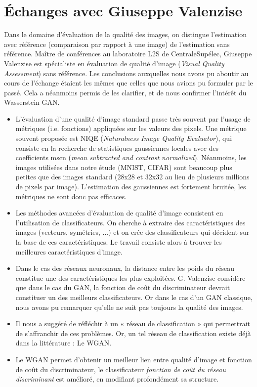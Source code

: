 \section{Échanges avec Giuseppe Valenzise}
Dans le domaine d'évaluation de la qualité des images, on distingue l'estimation avec référence (comparaison par rapport à une image) de l'estimation sans référence.
Maître de conférences au laboratoire L2S de CentraleSupélec, Giuseppe Valenzise est spécialiste en évaluation de qualité d'image (\textit{Visual Quality Assessment}) sans référence.
Les conclusions auxquelles nous avons pu aboutir au cours de l'échange étaient les mêmes que celles que nous avions pu formuler par le passé. Cela a néanmoins permis de les clarifier, et de nous confirmer l'intérêt du Wasserstein GAN. 
\begin{itemize}
\item L'évaluation d'une qualité d'image standard passe très souvent par l'usage de métriques (i.e. fonctions) appliquées sur les valeurs des pixels. Une métrique souvent proposée est NIQE (\textit{Naturalness Image Quality Evaluator}), qui consiste en la recherche de statistiques gaussiennes locales avec des coefficients mscn (\textit{mean subtracted and contrast normalized}). Néanmoins, les images utilisées dans notre étude (MNIST, CIFAR) sont beaucoup plus petites que des images standard (28x28 et 32x32 au lieu de plusieurs millions de pixels par image). L'estimation des gaussiennes est fortement bruitée, les métriques ne sont donc pas efficaces.
\item Les méthodes avancées d'évaluation de qualité d'image consistent en l'utilisation de classificateurs. On cherche à extraire des caractéristiques des images (vecteurs, symétries, ...) et on crée des classificateurs qui décident sur la base de ces caractéristiques. Le travail consiste alors à trouver les meilleures caractéristiques d'image.
\item Dans le cas des réseaux neuronaux, la distance entre les poids du réseau constitue une des caractéristiques les plus exploitées. G. Valenzise considère que dans le cas du GAN, la fonction de coût du discriminateur devrait constituer un des meilleurs classificateurs. Or dans le cas d'un GAN classique, nous avons pu remarquer qu'elle ne suit pas toujours la qualité des images.
\item Il nous a suggéré de réfléchir à un « réseau de classification » qui permettrait de s'affranchir de ces problèmes. Or, un tel réseau de classification existe déjà dans la littérature : Le WGAN.  
\item Le WGAN permet d'obtenir un meilleur lien entre qualité d'image et fonction de coût du discriminateur, le classificateur \textit{fonction de coût du réseau discriminant} est amélioré, en modifiant profondément sa structure.
\end{itemize}

